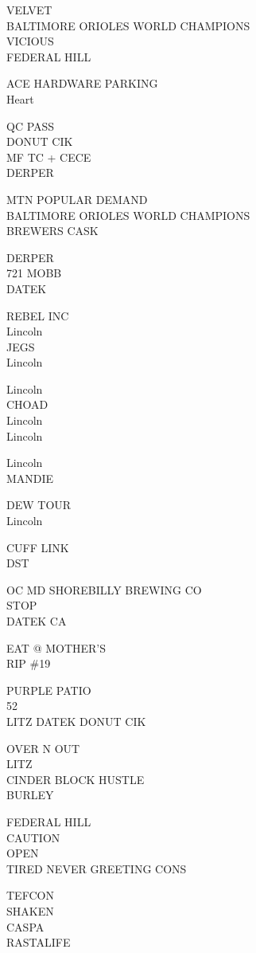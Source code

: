 \documentclass[10pt,letterpaper]{article}
\begin{document}
VELVET\\
BALTIMORE ORIOLES WORLD CHAMPIONS\\
VICIOUS\\
FEDERAL HILL

ACE HARDWARE PARKING\\
Heart

QC PASS\\
DONUT CIK\\
MF TC + CECE\\
DERPER

MTN POPULAR DEMAND\\
BALTIMORE ORIOLES WORLD CHAMPIONS\\
BREWERS CASK

DERPER\\
721 MOBB\\
DATEK

REBEL INC\\
Lincoln\\
JEGS\\
Lincoln

Lincoln\\
CHOAD\\
Lincoln\\
Lincoln

Lincoln\\
MANDIE

DEW TOUR\\
Lincoln

CUFF LINK\\
DST

OC MD SHOREBILLY BREWING CO\\
STOP\\
DATEK CA

EAT @ MOTHER'S\\
RIP \#19

PURPLE PATIO\\
52\\
LITZ DATEK DONUT CIK

OVER N OUT\\
LITZ\\
CINDER BLOCK HUSTLE\\
BURLEY

FEDERAL HILL\\
CAUTION\\
OPEN\\
TIRED NEVER GREETING CONS

TEFCON\\
SHAKEN\\
CASPA\\
RASTALIFE
\end{document}
